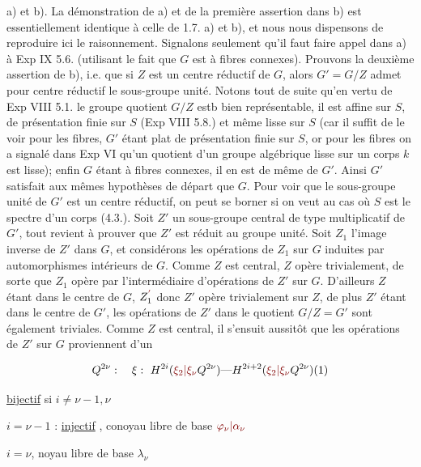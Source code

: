 a) et b). La démonstration de a) et de la première assertion dans b) est essentiellement identique à celle de 1.7. a) et b), et nous nous dispensons de reproduire ici le raisonnement. Signalons seulement qu'il faut faire appel dans a) à Exp IX 5.6. (utilisant le fait que $G$ est à fibres connexes). Prouvons la deuxième assertion de b), i.e. que si $Z$ est un centre réductif de $G$, alors $G'=G/Z$ admet pour centre réductif le sous-groupe unité. Notons tout de suite qu'en vertu de Exp VIII 5.1. le groupe quotient $G/Z$ estb bien représentable, il est affine sur $S$, de présentation finie sur $S$ (Exp VIII 5.8.) et même lisse sur $S$ (car il suffit de le voir pour les fibres, $G'$ étant plat de présentation finie sur $S$, or pour les fibres  on a signalé dans Exp VI qu'un quotient d'un groupe algébrique lisse sur un corps $k$ est lisse); enfin $G$ étant à fibres connexes, il en est de même de $G'$. Ainsi $G'$ satisfait aux mêmes hypothèses de départ que $G$. Pour voir que le sous-groupe unité de $G'$ est un centre réductif, on peut se borner si on veut au cas où $S$ est le spectre d'un corps (4.3.). Soit $Z'$ un sous-groupe central de type multiplicatif de $G'$, tout revient à prouver que $Z'$ est réduit au groupe unité. Soit $Z_1$  l'image inverse de $Z'$ dans $G$, et considérons les opérations de $Z_1$ sur $G$ induites par automorphismes intérieurs de $G$. Comme $Z$ est central, $Z$ opère  trivialement, de sorte que $Z_1$ opère par l'intermédiaire d'opérations de $Z'$ sur $G$. D'ailleurs $Z$ étant dans le centre de $G$, $Z_1^{\deleted{\unsure{'}}}$ donc $Z'$ opère trivialement sur $Z$, de plus $Z'$ étant dans le centre de $G'$, les opérations de $Z'$ dans le quotient $G/Z=G'$ \unsure{(}sont également triviales. Comme $Z$ est central, il s'ensuit aussitôt que les opérations de $Z'$ sur $G$ proviennent d'un

\[
Q^{2\nu}:\quad \xi:\ H^{2i}(\deleted{\unsure{\xi_2|\xi_\nu}}Q^{2\nu})
\text{---}H^{2i+2}(\deleted{\unsure{\xi_2|\xi_\nu}}Q^{2\nu})(1)
\]
    
\uline{bijectif} si $i\neq\nu-1,\nu$

$i=\nu-1$ : \uline{injectif} , conoyau libre de base $\unsure{\varphi_\nu|\alpha_\nu}$

$i=\nu$\qquad {}, noyau libre de base $\lambda_\nu$

